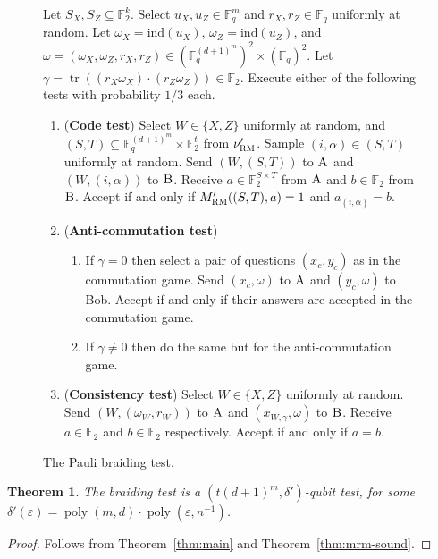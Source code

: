 \documentclass[11pt]{article}
\newtheorem{theorem}{Theorem}[section]
\theoremstyle{definition}
\newcommand{\field}{\mathbb{F}_2}
\newcommand{\F}{\ensuremath{\mathbb{F}}}
\newcommand{\RM}{\ensuremath{\textsc{RM}}}
\newcommand{\ind}{\ensuremath{\mathrm{ind}}}
\DeclareMathOperator{\poly}{poly}
\newcommand{\eps}{\varepsilon}
\DeclareMathOperator{\tr}{tr}
\newcommand{\labelstyle}[1]{\ensuremath{\textsc{#1}}\xspace}
\newcommand{\alice}{\labelstyle{A}}
\newcommand{\bob}{\labelstyle{B}}
\newenvironment{gamespec}{
  \begin{mdframed}[style=figstyle]}{
  \end{mdframed}}
\begin{document}
\begin{figure}[!htbp]
  \centering
  \begin{gamespec}
Let $S_X,S_Z\subseteq \field^k$.  Select $u_X,u_Z \in \F_q^m$ and $r_X,r_Z\in \F_q$ uniformly at random. Let $\omega_X = \ind(u_X)$, $\omega_Z=\ind(u_Z)$, and  $\omega = (\omega_X,\omega_Z,r_X,r_Z)\in (\F_q^{(d+1)^m})^2 \times (\F_q)^2$. Let 
$\gamma = \tr((r_X\omega_X) \cdot (r_Z\omega_Z)) \in \F_2$.
 Execute either of the following tests with probability $1/3$ each. 
\begin{enumerate}
      \setlength\itemsep{1pt}
    \item (\textbf{Code test}) Select $W\in \{X,Z\}$ uniformly at random, and $(S,T)\subseteq \F_q^{(d+1)^m} \times \F_2^t$ from $\nu'_\RM$. Sample $(i,\alpha)\in (S,T)$ uniformly at random. Send $(W,(S,T))$ to $\alice$ and $(W,(i,\alpha))$ to $\bob$. Receive $a\in \F_2^{S\times T}$ from $\alice$ and $b\in \F_2$ from $\bob$. Accept if and only if $M'_\RM((S,T),a)=1$ and $a_{(i,\alpha)} = b$.  
    \item (\textbf{Anti-commutation test}) 
		\begin{enumerate}
		\item If $\gamma=0$ then select a pair of questions $(x_c,y_c)$ as in the commutation game. Send $(x_c,\omega)$ to $\alice$ and $(y_c,\omega)$ to Bob. Accept if and only if their answers are accepted in the commutation game. 
		\item If $\gamma\neq 0$ then do the same but for the anti-commutation game. 
		\end{enumerate} 
		 \item (\textbf{Consistency test}) Select $W\in \{X,Z\}$ uniformly at random. Send $(W,(\omega_W,r_W))$ to $\alice$ and $(x_{W,\gamma},\omega)$ to $\bob$. Receive $a\in \F_2$ and $b\in \F_2$ respectively. Accept if and only if $a=b$. 
    \end{enumerate}
  \end{gamespec}
  \caption{The Pauli braiding test.}
  \label{fig:pauli-braiding}
\end{figure}




\begin{theorem}
The braiding test is a $(t(d+1)^m,\delta')$-qubit test, for some $\delta'(\eps)=\poly(m,d)\cdot \poly(\eps,n^{-1})$.
\end{theorem}

\begin{proof}
Follows from Theorem~\ref{thm:main} and Theorem~\ref{thm:mrm-sound}.
\end{proof}
\end{document}

